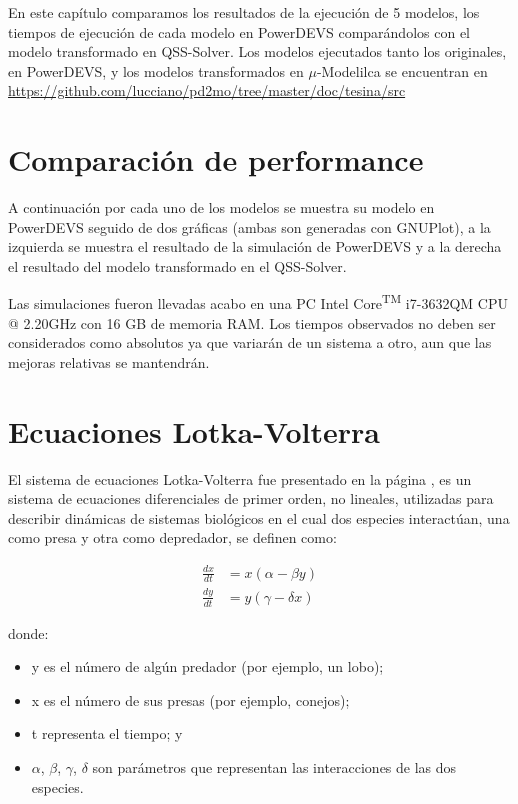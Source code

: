 	En este capítulo comparamos los resultados de la ejecución de 5 modelos, los tiempos de ejecución de cada modelo en PowerDEVS comparándolos con 
	el modelo transformado en QSS-Solver. 
	Los modelos ejecutados tanto los originales, en PowerDEVS, y los modelos 
	transformados en $\mu$-Modelilca se encuentran en \url{https://github.com/lucciano/pd2mo/tree/master/doc/tesina/src}

\section{Comparación de performance}
	A continuación por cada uno de los modelos se muestra su modelo en PowerDEVS seguido de dos gráficas (ambas son generadas con GNUPlot), 
	a la izquierda se muestra el resultado de la simulación de PowerDEVS y a la derecha el resultado del modelo transformado en el QSS-Solver.

	Las simulaciones fueron llevadas acabo en una PC Intel\textsuperscript{\textregistered} Core\textsuperscript{TM} i7-3632QM CPU @ 2.20GHz con 16 GB de memoria RAM. Los tiempos observados no deben ser considerados como absolutos ya que variarán de un sistema a otro, aun que las mejoras relativas se mantendrán.


\section{Ecuaciones Lotka-Volterra}

	El sistema de ecuaciones Lotka-Volterra fue presentado en la página \pageref{lotka_volterra_ref}, es un sistema de ecuaciones diferenciales de primer orden, no lineales, utilizadas para describir dinámicas de sistemas biológicos en el cual dos especies interactúan, una como presa y otra como depredador, se definen como:

\begin{align*}
\frac{dx}{dt} & = x(\alpha - \beta y)\\
\frac{dy}{dt} & =y(\gamma - \delta  x)
\end{align*}

donde:
\begin{itemize}
	\item y es el número de algún predador (por ejemplo, un lobo);
    \item x es el número de sus presas (por ejemplo, conejos);
    \item t representa el tiempo; y
    \item $\alpha$, $\beta$, $\gamma$, $\delta$ son parámetros que representan las interacciones de las dos especies.
\end{itemize}

